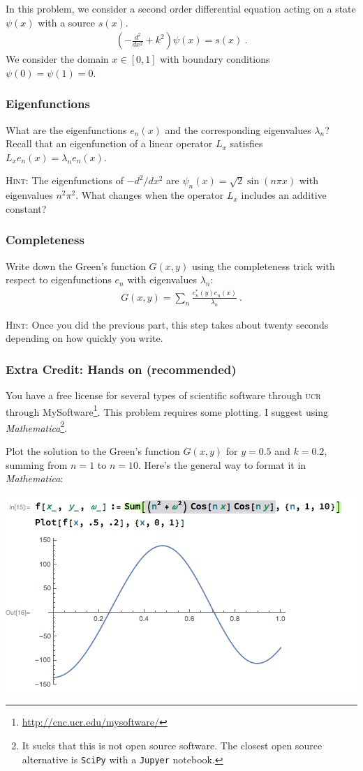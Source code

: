 \documentclass[12pt]{article}
\newcommand{\acro}[1]{\textsc{\MakeLowercase{#1}}}
\numberwithin{equation}{subsection}    %
\begin{document}
In this problem, we consider a second order differential equation acting on a state $\psi(x)$ with a source $s(x)$. 
\begin{align*}
	\left(-\frac{d^2}{dx^2} + k^2 \right) \psi(x) = s(x) \ .
\end{align*}
We consider the domain $x\in[0,1]$ with boundary conditions $\psi(0) = \psi(1) = 0$.

\subsubsection{Eigenfunctions}

What are the eigenfunctions $e_n(x)$ and the corresponding eigenvalues $\lambda_n$? Recall that an eigenfunction of a linear operator $L_x$ satisfies $L_x e_n(x) = \lambda_n e_n(x)$. 


\textsc{Hint:} The eigenfunctions of $-d^2/dx^2$ are $\psi_n(x) = \sqrt{2} \sin (n\pi x)$ with eigenvalues $n^2 \pi^2$. What changes when the operator $L_x$ includes an additive constant?


\subsubsection{Completeness}


Write down the Green's function $G(x,y)$ using the completeness trick with respect to eigenfunctions $e_n$ with eigenvalues $\lambda_n$: 
\begin{align}
	G(x,y) = \sum_n \frac{e_n^*(y)e_n(x)}{\lambda_n} \ .
\end{align}

\textsc{Hint:} Once you did the previous part, this step takes about twenty seconds depending on how quickly you write.


\subsubsection{Extra Credit: Hands on (recommended)}

You have a free license for several types of scientific software 
through \acro{UCR} through MySoftware\footnote{\url{http://cnc.ucr.edu/mysoftware/}}. This problem requires some plotting. I suggest using \emph{Mathematica}\footnote{It sucks that this is not open source software. The closest open source alternative is \texttt{SciPy} with a \texttt{Jupyer} notebook.}. 

Plot the solution to the Green's function $G(x,y)$ for $y = 0.5$ and $k = 0.2$, summing from $n=1$ to $n=10$. Here's the general way to format it in \emph{Mathematica}:
\begin{center}
	\includegraphics[width=.6\textwidth]{P231_2017_HW4_fig1.png}
\end{center}
\end{document}
